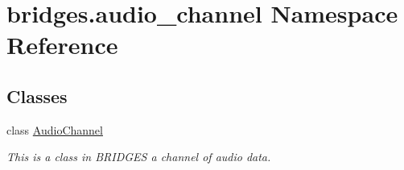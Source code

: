 \hypertarget{namespacebridges_1_1audio__channel}{}\section{bridges.\+audio\+\_\+channel Namespace Reference}
\label{namespacebridges_1_1audio__channel}
\subsection*{Classes}
\begin{DoxyCompactItemize}
\item 
class \mbox{\hyperlink{classbridges_1_1audio__channel_1_1_audio_channel}{Audio\+Channel}}
\begin{DoxyCompactList}\small\item\em This is a class in B\+R\+I\+D\+G\+ES a channel of audio data. \end{DoxyCompactList}\end{DoxyCompactItemize}
